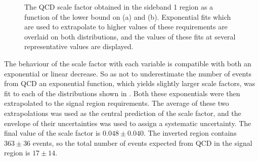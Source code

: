 \begin{figure}

  \caption{The \ac{QCD} scale factor obtained in the sideband 1 region as a function of the lower bound on \jetmetdphi (a) and \METsig (b). Exponential fits which are used to extrapolate to higher values of these requirements are overlaid on both distributions, and the values of these fits at several representative values are displayed.}
  \label{fig:parkedqcdsfvar}
\end{figure}

The behaviour of the scale factor with each variable is compatible with both an exponential or linear decrease. So as not to underestimate the number of events from \ac{QCD} an exponential function, which yields slightly larger scale factors, was fit to each of the distributions shown in . Both these exponentials were then extrapolated to the signal region requirements. The average of these two extrapolations was used as the central prediction of the scale factor, and the envelope of their uncertainties was used to assign a systematic uncertainty. The final value of the scale factor is $0.048\pm 0.040$. The inverted region contains $363\pm 36$ events, so the total number of events expected from \ac{QCD} in the signal region is $17\pm 14$.

